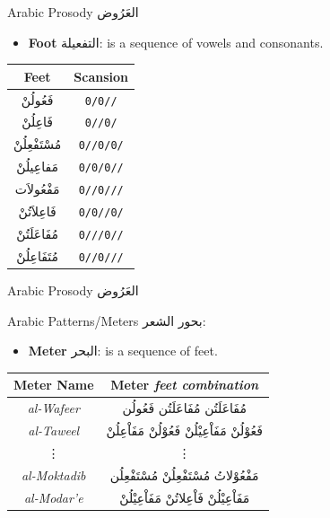 \documentclass[10pt]{beamer}
\begin{document}
\begin{frame}[fragile]{Arabic Prosody \textarabic{العَرُوض}}

\begin{itemize}
  \item \textbf{Foot} \textarabic{التفعيلة}: is a sequence of vowels and consonants.
\end{itemize}




\begin{center}
  \begin{tabular}{|c|c|} \hline
    \textbf{Feet} & \textbf{Scansion} \\
    \hline
    \textarabic{فَعُولُنْ}  & \texttt{0/0//}\\
    \textarabic{فَاعِلُنْ}  & \texttt{0//0/}\\
    \textarabic{مُسْتَفْعِلُنْ}& \texttt{0//0/0/}\\
    \textarabic{مَفاعِيلُنْ}& \texttt{0/0/0//}\\
    \textarabic{مَفْعُولاَت} & \texttt{0//0///}\\
    \textarabic{فَاعِلاَتُنْ} & \texttt{0/0//0/}\\
    \textarabic{مُفَاعَلَتُنْ}& \texttt{0///0//}\\
    \textarabic{مُتَفَاعِلُنْ}& \texttt{0//0///}\\
    \hline
  \end{tabular}
\end{center}

\end{frame}





\begin{frame}[fragile]{Arabic Prosody \textarabic{العَرُوض}}

Arabic Patterns/Meters \textarabic{بحور الشعر}:
\begin{itemize}
  \item \textbf{Meter} \textarabic{البحر}: is a sequence of \alert{feet}. 
\end{itemize}

\begin{center}
  \begin{tabular}[h!]{|c|c|} 
    \hline
    \textbf{Meter Name} & \textbf{Meter} \small{\textit{feet combination}} \\ 
    \hline
   \textit{al-Wafeer}    & \textarabic{مُفَاعَلَتُن مُفَاعَلَتُن فَعُولُن} \\ %
   \textit{al-Taweel}    & \textarabic{فَعُوْلُنْ مَفَاْعِيْلُنْ فَعُوْلُنْ مَفَاْعِلُنْ} \\ %
   \vdots                &  \vdots\\
   \textit{al-Moktadib}  & \textarabic{مَفْعُوْلاتُ مُسْتَفْعِلُنْ مُسْتَفْعِلُن} \\
   \textit{al-Modar'e}   & \textarabic{مَفَاْعِيْلُنْ فَاْعِلاتُنْ مَفَاْعِيْلُنْ} \\
    \hline
  \end{tabular}
\end{center}

\end{frame}
\end{document}
